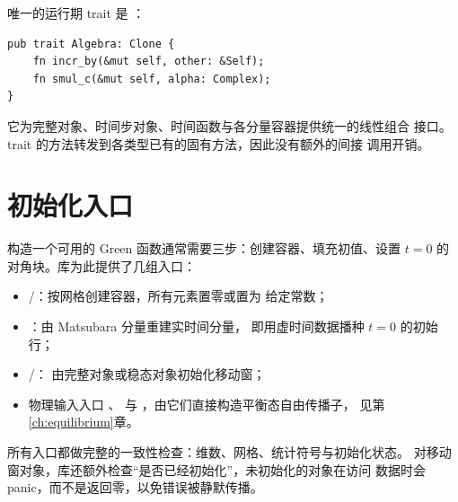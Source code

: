 唯一的运行期 trait 是 ：
\begin{lstlisting}[numbers=none]
pub trait Algebra: Clone {
    fn incr_by(&mut self, other: &Self);
    fn smul_c(&mut self, alpha: Complex);
}
\end{lstlisting}
它为完整对象、时间步对象、时间函数与各分量容器提供统一的线性组合
接口。trait 的方法转发到各类型已有的固有方法，因此没有额外的间接
调用开销。

\section{初始化入口}
\label{sec:init}

构造一个可用的 Green 函数通常需要三步：创建容器、填充初值、设置
$t=0$ 的对角块。库为此提供了几组入口：
\begin{itemize}
    \item {}/：按网格创建容器，所有元素置零或置为
          给定常数；
    \item {}：由 Matsubara 分量重建实时间分量，
          即用虚时间数据播种 $t=0$ 的初始行；
    \item {}/：
          由完整对象或稳态对象初始化移动窗；
    \item 物理输入入口 、 与
          ，由它们直接构造平衡态自由传播子，
          见第\ref{ch:equilibrium}章。
\end{itemize}

所有入口都做完整的一致性检查：维数、网格、统计符号与初始化状态。
对移动窗对象，库还额外检查“是否已经初始化”，未初始化的对象在访问
数据时会 panic，而不是返回零，以免错误被静默传播。
